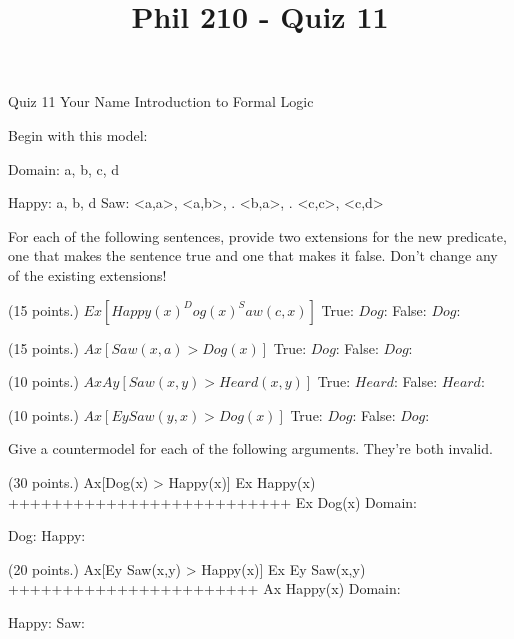 
\title{Phil 210 - Quiz 11}

\heading
Quiz 11
Your Name
Introduction to Formal Logic
\endheading

Begin with this model:

\answer
        \firstordermodel 
        Domain: a, b, c, d

        Happy:  a, b, d
        Saw:    <a,a>, <a,b>,
           .    <b,a>,
           .    <c,c>, <c,d>
        \endfirstordermodel
\endanswer\bigskip

For each of the following sentences, provide two extensions for the new predicate, one that makes the sentence true and one that makes it false. Don't change any of the existing extensions!

\quantifiers
\problems
{} (15 points.)
$ Ex[Happy(x) ^ Dog(x) ^ Saw(c,x)] $
        \answer
        True: $Dog$: 
        False: $Dog$: 
        \endanswer

 (15 points.)
$ Ax[Saw(x,a) > Dog(x)] $
        \answer
        True: $Dog$: 
        False: $Dog$: 
        \endanswer

 (10 points.)
$ AxAy[Saw(x,y) > Heard(x,y)] $
        \answer\makefomodelangles
        True: $Heard$: 
        False: $Heard$: 
        \endanswer

 (10 points.)
$ Ax[Ey Saw(y,x) > Dog(x)] $
        \answer
        True: $Dog$: 
        False: $Dog$: 
        \endanswer

\endproblems

Give a countermodel for each of the following arguments. They're both invalid.

\problems
{} (30 points.)
\argument
 Ax[Dog(x) > Happy(x)]
 Ex Happy(x)
++++++++++++++++++++++++++
 Ex Dog(x)
\endargument
        \answer
        \firstordermodel
        Domain: 

        Dog:    
        Happy:  
        \endfirstordermodel
        \endanswer

 (20 points.)
\argument
 Ax[Ey Saw(x,y) > Happy(x)]
 Ex Ey Saw(x,y)
+++++++++++++++++++++++
 Ax Happy(x)
\endargument
        \answer
        \firstordermodel
        Domain: 

        Happy:    
        Saw:  
        \endfirstordermodel
        \endanswer

\endproblems
\bye
